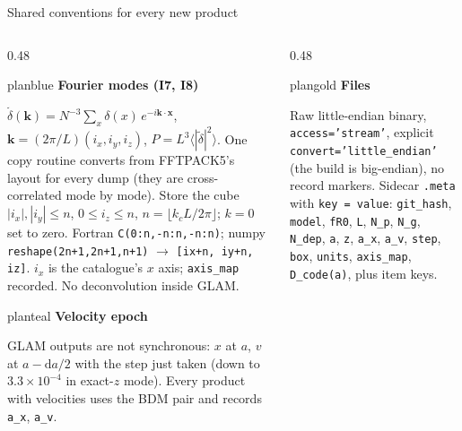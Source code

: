 \documentclass[UTF8]{beamer}
\begin{document}
\begin{frame}{Shared conventions for every new product}
  \footnotesize
  \begin{columns}[T,totalwidth=\textwidth]
    \begin{column}{0.48\textwidth}
      \begin{phasebox}{planblue}
        {\color{planblue}\bfseries Fourier modes (I7, I8)}\par\smallskip
        \scriptsize
        $\tilde\delta(\mathbf k) = N^{-3}\sum_x \delta(x)\,e^{-i\mathbf k\cdot\mathbf x}$, $\mathbf k = (2\pi/L)(i_x,i_y,i_z)$, $P = L^3\langle|\tilde\delta|^2\rangle$.
        One copy routine converts from FFTPACK5's layout for every dump (they are cross-correlated mode by mode).
        Store the cube $|i_x|,|i_y| \le n$, $0 \le i_z \le n$, $n = \lfloor k_c L/2\pi \rfloor$; $k = 0$ set to zero.
        Fortran \texttt{C(0:n,-n:n,-n:n)}; numpy \texttt{reshape(2n+1,2n+1,n+1)} $\to$ \texttt{[ix+n, iy+n, iz]}.
        $i_x$ is the catalogue's $x$ axis; \texttt{axis\_map} recorded. No deconvolution inside GLAM.
      \end{phasebox}
      \vspace{0.3ex}
      \begin{phasebox}{planteal}
        {\color{planteal}\bfseries Velocity epoch}\par\smallskip
        \scriptsize
        GLAM outputs are not synchronous: $x$ at $a$, $v$ at $a - \mathrm{d}a/2$ with the step just taken
        (down to $3.3\times10^{-4}$ in exact-$z$ mode). Every product with velocities uses the BDM pair and records \texttt{a\_x}, \texttt{a\_v}.
      \end{phasebox}
    \end{column}
    \hfill
    \begin{column}{0.48\textwidth}
      \begin{phasebox}{plangold}
        {\color{plangold}\bfseries Files}\par\smallskip
        \scriptsize
        Raw little-endian binary, \texttt{access='stream'}, explicit \texttt{convert='little\_endian'} (the build is big-endian), no record markers.
        Sidecar \texttt{.meta} with \texttt{key = value}: \texttt{git\_hash}, \texttt{model}, \texttt{fR0}, \texttt{L}, \texttt{N\_p}, \texttt{N\_g}, \texttt{N\_dep},
        \texttt{a}, \texttt{z}, \texttt{a\_x}, \texttt{a\_v}, \texttt{step}, \texttt{box}, \texttt{units}, \texttt{axis\_map}, \texttt{D\_code(a)}, plus item keys.

\end{phasebox}
\end{column}
\end{columns}
\end{frame}
\end{document}
